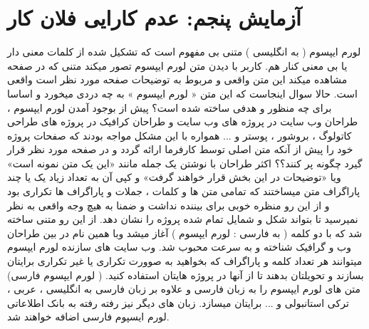 \section{آزمایش پنجم: عدم کارایی فلان کار}
لورم ایپسوم ( به انگلیسی  ) متنی بی مفهوم است که تشکیل شده از کلمات معنی دار یا بی معنی کنار هم. کاربر با دیدن متن لورم ایپسوم تصور میکند متنی که در صفحه مشاهده میکند این متن واقعی و مربوط به توضیحات صفحه مورد نظر است واقعی است. حالا سوال اینجاست که این متن « لورم ایپسوم » به چه دردی میخورد و اساسا برای چه منظور و هدفی ساخته شده است؟ پیش از بوجود آمدن لورم ایپسوم ، طراحان وب سایت در پروژه های وب سایت و طراحان کرافیک در پروژه های طراحی کاتولوگ ، بروشور ، پوستر و ... همواره با این مشکل مواجه بودند که صفحات پروژه خود را پیش از آنکه متن اصلی توسط کارفرما ارائه گردد و در صفحه مورد نظر قرار گیرد چگونه پر کنند؟؟ اکثر طراحان با نوشتن یک جمله مانند «این یک متن نمونه است» ویا «توضیحات در این بخش قرار خواهند گرفت» و کپی آن به تعداد زیاد یک یا چند پاراگراف متن میساختند که تمامی متن ها و کلمات ، جملات و پاراگراف ها تکراری بود و از این رو منظره خوبی برای بیننده نداشت و ضمنا به هیچ وجه واقعی به نظر نمیرسید تا بتواند شکل و شمایل تمام شده پروژه را نشان دهد. از این رو متنی ساخته شد که با دو کلمه ( به فارسی : لورم ایپسوم ) آغاز میشد وبا همین نام در بین طراحان وب و گرافیک شناخته و به سرعت محبوب شد. وب سایت های سازنده لورم ایپسوم میتوانند هر تعداد کلمه و پاراگراف که بخواهید به صوورت تکراری یا غیر تکراری برایتان بسازند و تحویلتان بدهند تا از آنها در پروژه هایتان استفاده کنید. ( لورم ایپسوم فارسی) متن های لورم ایپسوم را به زبان فارسی و علاوه بر زبان فارسی به انگلیسی ، عربی ، ترکی استانبولی و ... برایتان میسازد. زبان های دیگر نیز رفته رفته به بانک اطلاعاتی لورم ایسپوم فارسی اضافه خواهند شد.  


